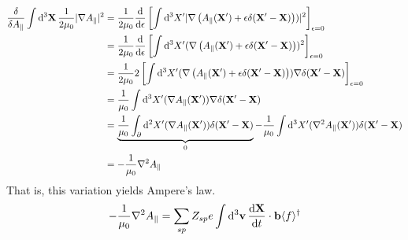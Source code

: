 \begin{align}
  \frac{\delta}{\delta A_\parallel}\int {\rm d}^3 {\bf X} \, \frac{1 }{ 2 \mu_0} \vert \nabla A_\parallel \vert^2 
&=\frac{1}{2\mu_0}\frac{\mathrm{d} }{\mathrm{d} \epsilon}\left[\int\mathrm{d}^3X^\prime |\nabla \left(A_\parallel(\mathbf{X}^\prime)+ \epsilon\delta(\mathbf{X}^\prime - \mathbf{X})\right))|^2\right]_{\epsilon=0}  \nonumber\\
&=\frac{1}{2\mu_0}\frac{\mathrm{d} }{\mathrm{d} \epsilon}\left[\int\mathrm{d}^3X^\prime (\nabla \left(A_\parallel(\mathbf{X}^\prime)+ \epsilon\delta(\mathbf{X}^\prime - \mathbf{X})\right))^2\right]_{\epsilon=0}  \nonumber\\
&=\frac{1}{2\mu_0}2\left[\int\mathrm{d}^3X^\prime (\nabla\left( A_\parallel(\mathbf{X}^\prime)+ \epsilon\delta(\mathbf{X}^\prime - \mathbf{X})\right))\nabla\delta(\mathbf{X}^\prime - \mathbf{X})\right]_{\epsilon=0}  \nonumber\\
&=\frac{1}{\mu_0}\int\mathrm{d}^3X^\prime (\nabla A_\parallel(\mathbf{X}^\prime))\nabla\delta(\mathbf{X}^\prime - \mathbf{X})  \nonumber\\
&= \underbrace{\frac{1}{\mu_0}\int_\partial\mathrm{d}^2X'(\nabla A_\parallel(\mathbf{X}^\prime))\delta(\mathbf{X}^\prime - \mathbf{X})}_0
- \frac{1}{\mu_0}\int\mathrm{d}^3X^\prime (\nabla^2 A_\parallel(\mathbf{X}^\prime))\delta(\mathbf{X}^\prime - \mathbf{X})  \nonumber\\
&= -\frac{1}{\mu_0}\nabla^2A_\parallel
\end{align}
That is, this variation yields Ampere's law.
\begin{equation}
- \frac{1}{\mu_0}\nabla^2 A_\parallel = \sum_{sp} Z_{sp} e \int {\rm d}^3 {\bf v} \, \frac{\mathrm{d} \bf X}{\mathrm{d} t} \cdot {\bf b} \langle f \rangle^\dagger  
\label{eq:ampereslaw}
\end{equation} 

